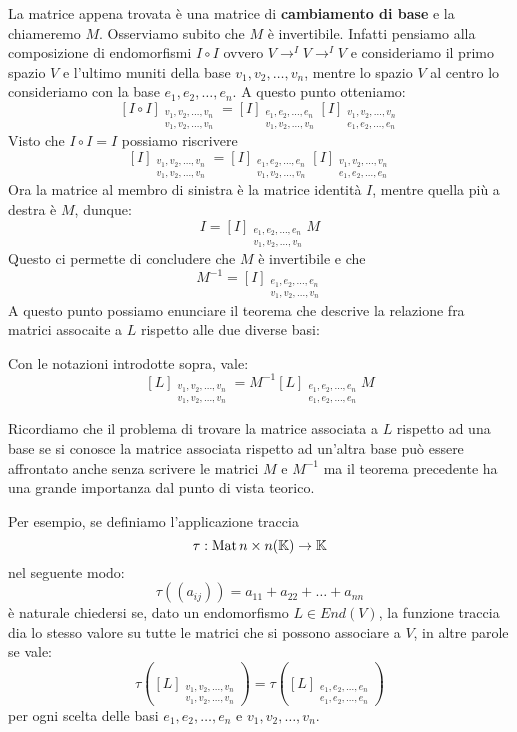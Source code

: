 La matrice appena trovata è una matrice di
\textbf{cambiamento di base} e la chiameremo $M$. Osserviamo subito che $M$ è
invertibile. Infatti pensiamo alla composizione di endomorfismi $I \circ I$
ovvero $V \to^{I} V \to^{I} V$ e consideriamo il primo spazio $V$ e l'ultimo muniti
della base $v_1, v_2, \dots, v_n$, mentre lo spazio $V$ al centro lo consideriamo
con la base $e_1, e_2, \dots, e_n$. A questo punto otteniamo:
\[
	[I \circ I]_{\substack{
	v_1, v_2, \dots, v_n \\
	v_1, v_2, \dots, v_n
}} =
		[I]_{\substack{
				e_1, e_2, \dots, e_n\\
				v_1, v_2, \dots, v_n
			}}
		[I]_{\substack{
				v_1, v_2, \dots, v_n\\
				e_1, e_2, \dots, e_n
			}}
\]
Visto che $I \circ I = I$ possiamo riscrivere
\[
	[I]_{\substack{
	v_1, v_2, \dots, v_n \\
	v_1, v_2, \dots, v_n
}} =
		[I]_{\substack{
				e_1, e_2, \dots, e_n\\
				v_1, v_2, \dots, v_n
			}}
		[I]_{\substack{
				v_1, v_2, \dots, v_n\\
				e_1, e_2, \dots, e_n
			}}
\]
Ora la matrice al membro di sinistra è la matrice identità $I$, mentre quella
più a destra è $M$, dunque:
\[
	I = [I]_{\substack{
		e_1, e_2, \dots, e_n\\
		v_1, v_2, \dots, v_n
	}} M
\]
Questo ci permette di concludere che $M$ è invertibile e che
\[
	M^{-1} = [I]_{\substack{
				e_1, e_2, \dots, e_n\\
				v_1, v_2, \dots, v_n
			}}
\]
A questo punto possiamo enunciare il teorema che descrive la relazione fra matrici
assocaite a $L$ rispetto alle due diverse basi:
\begin{theorem}
	Con le notazioni introdotte sopra, vale:
	\[
		[L]_{\substack{
					v_1, v_2, \dots, v_n \\
					v_1, v_2, \dots, v_n
				}} =
		M^{-1}[L]_{\substack{
					e_1, e_2, \dots, e_n\\
					e_1, e_2, \dots, e_n
				}}M
	\]
\end{theorem}

Ricordiamo che il problema di trovare la matrice associata a $L$ rispetto ad una
base se si conosce la matrice associata rispetto ad un'altra base può essere
affrontato anche senza scrivere le matrici $M$ e $M^{-1}$ ma il teorema precedente
ha una grande importanza dal punto di vista teorico.

Per esempio, se definiamo l'applicazione traccia
\[
	\tau : \operatorname{Mat}{n \times n}(\mathbb{K}) \to \mathbb{K}
\]
nel seguente modo:
\[
	\tau((a_{ij})) = a_{11} + a_{22} + \dots + a_{nn}
\]
è naturale chiedersi se, dato un endomorfismo $L \in End(V)$, la funzione traccia
dia lo stesso valore su tutte le matrici che si possono associare a $V$, in altre
parole se vale:
\[
	\tau \left(
	[L]_{\substack{
			v_1, v_2, \dots, v_n \\
			v_1, v_2, \dots, v_n
		}}
	\right) =
	\tau \left(
	[L]_{\substack{
			e_1, e_2, \dots, e_n \\
			e_1, e_2, \dots, e_n
		}}
	\right)
\]
per ogni scelta delle basi $e_1, e_2, \dots, e_n$ e $v_1, v_2, \dots, v_n$.

